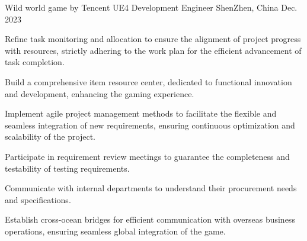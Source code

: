 

\begin{cventries}

  \cventry
    {Wild world game by Tencent} %
    {UE4 Development Engineer} %
    {ShenZhen, China} %
    {Dec. 2023} %
    {
      \begin{cvitems} %
        \item {Refine task monitoring and allocation to ensure the alignment of project progress with resources, strictly adhering to the work plan for the efficient advancement of task completion.}
        \item {Build a comprehensive item resource center, dedicated to functional innovation and development, enhancing the gaming experience.}
        \item {Implement agile project management methods to facilitate the flexible and seamless integration of new requirements, ensuring continuous optimization and scalability of the project.}
        \item {Participate in requirement review meetings to guarantee the completeness and testability of testing requirements.}
        \item {Communicate with internal departments to understand their procurement needs and specifications.}
        \item {Establish cross-ocean bridges for efficient communication with overseas business operations, ensuring seamless global integration of the game.}
      \end{cvitems}
    }

\end{cventries}

